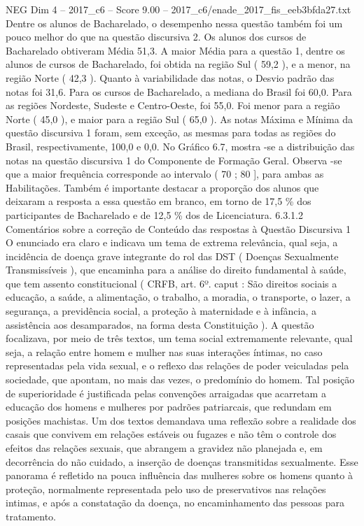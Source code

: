 \begin{textsample}{NEG Dim 4 – 2017\_c6 – Score 9.00 – 2017\_c6/enade\_2017\_fis\_eeb3bfda27.txt}
Dentre os alunos de Bacharelado, o desempenho nessa questão também foi um pouco melhor do que na questão discursiva 2.
Os alunos dos cursos de Bacharelado obtiveram Média 51,3.
A maior Média para a questão 1, dentre os alunos de cursos de Bacharelado, foi obtida na região Sul ( 59,2 ), e a menor, na região Norte ( 42,3 ).
Quanto à variabilidade das notas, o Desvio padrão das notas foi 31,6.
Para os cursos de Bacharelado, a mediana do Brasil foi 60,0.
Para as regiões Nordeste, Sudeste e Centro-Oeste, foi 55,0.
Foi menor para a região Norte ( 45,0 ), e maior para a região Sul ( 65,0 ).
As notas Máxima e Mínima da questão discursiva 1 foram, sem exceção, as mesmas para todas as regiões do Brasil, respectivamente, 100,0 e 0,0.
No Gráfico 6.7, mostra -se a distribuição das notas na questão discursiva 1 do Componente de Formação Geral.
Observa -se que a maior frequência corresponde ao intervalo ( 70 ; 80 ], para ambas as Habilitações.
Também é importante destacar a proporção dos alunos que deixaram a resposta a essa questão em branco, em torno de 17,5 \% dos participantes de Bacharelado e de 12,5 \% dos de Licenciatura. 6.3.1.2 Comentários sobre a correção de Conteúdo das respostas à Questão Discursiva 1 O enunciado era claro e indicava um tema de extrema relevância, qual seja, a incidência de doença grave integrante do rol das DST ( Doenças Sexualmente Transmissíveis ), que encaminha para a análise do direito fundamental à saúde, que tem assento constitucional ( CRFB, art. 6º. caput : São direitos sociais a educação, a saúde, a alimentação, o trabalho, a moradia, o transporte, o lazer, a segurança, a previdência social, a proteção à maternidade e à infância, a assistência aos desamparados, na forma desta Constituição ).
A questão focalizava, por meio de três textos, um tema social extremamente relevante, qual seja, a relação entre homem e mulher nas suas interações íntimas, no caso representadas pela vida sexual, e o reflexo das relações de poder veiculadas pela sociedade, que apontam, no mais das vezes, o predomínio do homem.
Tal posição de superioridade é justificada pelas convenções arraigadas que acarretam a educação dos homens e mulheres por padrões patriarcais, que redundam em posições machistas.
Um dos textos demandava uma reflexão sobre a realidade dos casais que convivem em relações estáveis ou fugazes e não têm o controle dos efeitos das relações sexuais, que abrangem a gravidez não planejada e, em decorrência do não cuidado, a inserção de doenças transmitidas sexualmente.
Esse panorama é refletido na pouca influência das mulheres sobre os homens quanto à proteção, normalmente representada pelo uso de preservativos nas relações intimas, e após a constatação da doença, no encaminhamento das pessoas para tratamento.

\end{textsample}
